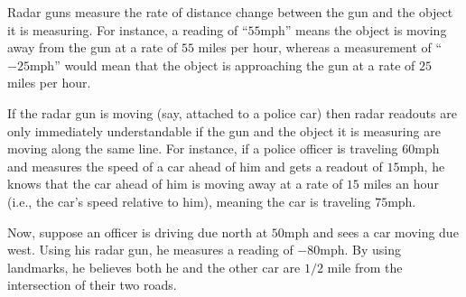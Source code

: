 \documentclass{ximera}
\author{Gregory Hartman \and Matthew Carr}
\begin{document}
\begin{exercise}



Radar guns measure the rate of distance change between the gun and the
object it is measuring. For instance, a reading of ``$55$mph'' means
the object is moving away from the gun at a rate of $55$ miles per
hour, whereas a measurement of ``$-25$mph'' would mean that the object
is approaching the gun at a rate of $25$ miles per hour.

If the radar gun is moving (say, attached to a police car) then radar
readouts are only immediately understandable if the gun and the object
it is measuring are moving along the same line. For instance, if a
police officer is traveling $60$mph and measures the speed of a car
ahead of him and gets a readout of $15$mph, he knows that the car
ahead of him is moving away at a rate of $15$ miles an hour (i.e., the
car's speed relative to him), meaning the car is traveling $75$mph.


Now, suppose an officer is driving due north at $50$mph and sees a car
moving due west. Using his radar gun, he measures a reading of
$-80$mph. By using landmarks, he believes both he and the other car
are $1/2$ mile from the intersection of their two roads.


\end{exercise}
\end{document}

